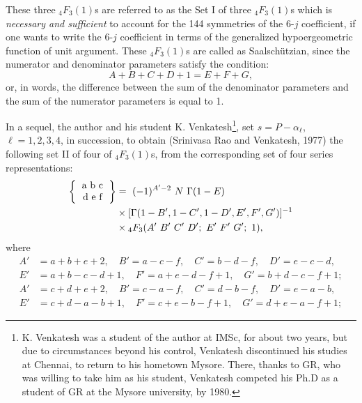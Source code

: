 These three ${}_4F_3(1)$s are referred to as the Set I of three ${}_4F_3(1)$s 
which is \textit{necessary and sufficient} to account for the 144 symmetries of the 
6-$j$ coefficient, if one wants to write the 6-$j$ coefficient in terms of the 
generalized hypoergeometric function of unit argument. These ${}_4F_3(1)$s are 
called as Saalschützian, since the numerator and denominator parameters 
satisfy the condition:
\begin{equation}
A+B+C+D+1 = E+F+G, \label{chap29-eq36}
\end{equation}
or, in words, the difference between the sum of the denominator parameters and 
the sum of the numerator parameters is equal to 1.

In a sequel, the author and his student K. Venkatesh\footnote{K. Venkatesh 
was a student of the author at IMSc, for about two years, but due to circumstances 
beyond his control, Venkatesh discontinued his studies at Chennai, to return to 
his hometown Mysore. There, thanks to GR, who was willing to take him as his 
student, Venkatesh competed his Ph.D as a student of GR at the Mysore university, 
by 1980.}, set $s = P-\alpha_\ell$, $\ell=1,2,3,4$,
in succession, to obtain (Srinivasa Rao and Venkatesh, 1977) the following set II 
of four of $_4F_3(1)$s, from the corresponding set of four series representations:
\begin{equation}
\begin{split}
\left\{
\begin{tabular} {c} 
a\ b\ c\\ 
d\ e\ f \\ 
\end{tabular} 
\right\}
& = \ (-1)^{A'-2}\ N\ \Gamma(1-E)\\
& \times [\Gamma(1-B', 1-C', 1-D', E', F', G')]^{-1}\\
& \times {}_4F_3(A'\ B'\ C'\ D';\ E'\ F'\ G';\ 1), \label{chap29-eq37}
\end{split}
\end{equation}
where
\begin{equation}
\begin{split}
A' & = a+b+e+2, \quad B'=a-c-f, \quad C'=b-d-f, \quad D'=e-c-d,\\
E' & = a+b-c-d+1, \quad F'=a+e-d-f+1, \quad G'=b+d-c-f+1;\label{chap29-eq38}
\end{split}
\end{equation}
\begin{equation}
\begin{split}
A' & = c+d+e+2, \quad B'=c-a-f, \quad C'=d-b-f, \quad D'=e-a-b,\\
E' & = c+d-a-b+1, \quad F'=c+e-b-f+1, \quad G'=d+e-a-f+1;\label{chap29-eq39}
\end{split}
\end{equation}

